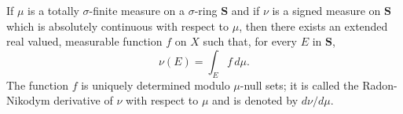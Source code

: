 If $\mu$ is a totally $\sigma$-finite measure on a $\sigma$-ring $\mathbf{S}$ and if $\nu$ is a signed measure on $\mathbf{S}$ which is absolutely continuous with respect to $\mu$, then there exists an extended real valued, measurable function $f$ on $X$ such that, for every $E$ in $\mathbf{S}$,
$$\nu(E) = \int_E f \,d\mu.$$
The function $f$ is uniquely determined modulo $\mu$-null sets; it is called the Radon-Nikodym derivative of $\nu$ with respect to $\mu$ and is denoted by $d\nu/d\mu$.
